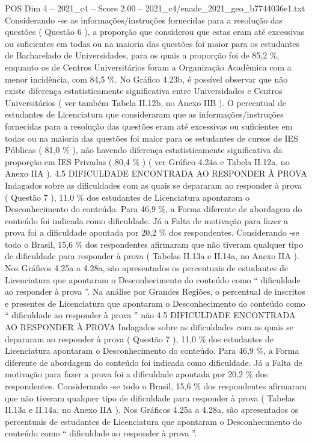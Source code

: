 \begin{textsample}{POS Dim 4 – 2021\_c4 – Score 2.00 – 2021\_c4/enade\_2021\_geo\_b7744036e1.txt}
Considerando -se as informações/instruções fornecidas para a resolução das questões ( Questão 6 ), a proporção que considerou que estas eram até excessivas ou suficientes em todas ou na maioria das questões foi maior para os estudantes de Bacharelado de Universidades, para os quais a proporção foi de 85,2 \%, enquanto os de Centros Universitários foram a Organização Acadêmica com a menor incidência, com 84,5 \%.
No Gráfico 4.23b, é possível observar que não existe diferença estatisticamente significativa entre Universidades e Centros Universitários ( ver também Tabela II.12b, no Anexo IIB ).
O percentual de estudantes de Licenciatura que consideraram que as informações/instruções fornecidas para a resolução das questões eram até excessivas ou suficientes em todas ou na maioria das questões foi maior para os estudantes de cursos de IES Públicas ( 81,0 \% ), não havendo diferença estatisticamente significativa da proporção em IES Privadas ( 80,4 \% ) ( ver Gráfico 4.24a e Tabela II.12a, no Anexo IIA ). 4.5 DIFICULDADE ENCONTRADA AO RESPONDER À PROVA Indagados sobre as dificuldades com as quais se depararam ao responder à prova ( Questão 7 ), 11,0 \% dos estudantes de Licenciatura apontaram o Desconhecimento do conteúdo.
Para 46,9 \%, a Forma diferente de abordagem do conteúdo foi indicada como dificuldade.
Já a Falta de motivação para fazer a prova foi a dificuldade apontada por 20,2 \% dos respondentes.
Considerando -se todo o Brasil, 15,6 \% dos respondentes afirmaram que não tiveram qualquer tipo de dificuldade para responder à prova ( Tabelas II.13a e II.14a, no Anexo IIA ).
Nos Gráficos 4.25a a 4.28a, são apresentados os percentuais de estudantes de Licenciatura que apontaram o Desconhecimento do conteúdo como “ dificuldade ao responder à prova ”.
Na análise por Grandes Regiões, o percentual de inscritos e presentes de Licenciatura que apontaram o Desconhecimento do conteúdo como “ dificuldade ao responder à prova ” não 4.5 DIFICULDADE ENCONTRADA AO RESPONDER À PROVA Indagados sobre as dificuldades com as quais se depararam ao responder à prova ( Questão 7 ), 11,0 \% dos estudantes de Licenciatura apontaram o Desconhecimento do conteúdo.
Para 46,9 \%, a Forma diferente de abordagem do conteúdo foi indicada como dificuldade.
Já a Falta de motivação para fazer a prova foi a dificuldade apontada por 20,2 \% dos respondentes.
Considerando -se todo o Brasil, 15,6 \% dos respondentes afirmaram que não tiveram qualquer tipo de dificuldade para responder à prova ( Tabelas II.13a e II.14a, no Anexo IIA ).
Nos Gráficos 4.25a a 4.28a, são apresentados os percentuais de estudantes de Licenciatura que apontaram o Desconhecimento do conteúdo como “ dificuldade ao responder à prova ”.

\end{textsample}
